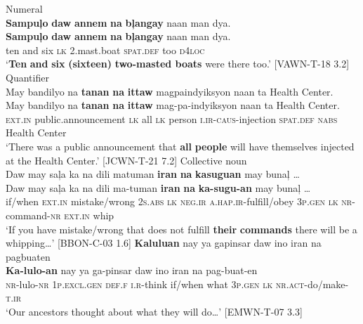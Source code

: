 \newpage
\ea
Numeral \\
\textbf{Sampuļo}  \textbf{daw}  \textbf{annem}  \textbf{na}  \textbf{bļangay}  naan  man  dya. \\\smallskip
 \gll \textbf{Sampuļo}  \textbf{daw}  \textbf{annem}  \textbf{na}  \textbf{bļangay}  naan  man  dya. \\
ten  and  six  \textsc{lk}  2.mast.boat  \textsc{spat.def} too  \textsc{d}4\textsc{loc} \\
\glt ‘\textbf{Ten} \textbf{and} \textbf{six} \textbf{(sixteen)} \textbf{two-masted boats} were there too.’ [VAWN-T-18 3.2]
\z
\ea
Quantifier \\
May  bandilyo  na  \textbf{tanan}  \textbf{na}  \textbf{ittaw}  magpaindyiksyon naan  ta  Health Center. \\\smallskip
 \gll May  bandilyo  na  \textbf{tanan}  \textbf{na}  \textbf{ittaw}  mag-pa-indyiksyon naan  ta  Health Center. \\
\textsc{ext.in} public.announcement  \textsc{lk}  all  \textsc{lk}  person  \textsc{i.ir}-\textsc{caus}-injection
\textsc{spat.def}  \textsc{nabs} Health Center \\
\glt `There was a public announcement that \textbf{all} \textbf{people} will have themselves injected at the Health Center.’ [JCWN-T-21 7.2]
\z
\ea
Collective noun \\
Daw  may  saļa  ka  na  dili  matuman \textbf{iran}  \textbf{na}  \textbf{kasuguan}  may   bunaļ … \\\smallskip
 \gll Daw  may  saļa  ka  na  dili  ma-tuman \textbf{iran}  \textbf{na}  \textbf{ka-sugu-an}  may   bunaļ … \\
if/when  \textsc{ext.in}  mistake/wrong  2\textsc{s.abs}  \textsc{lk}  \textsc{neg.ir}  \textsc{a.hap.ir}-fulfill/obey
3\textsc{p.gen}  \textsc{lk}  \textsc{nr}-command-\textsc{nr}  \textsc{ext.in}  whip \\
\glt `If you have mistake/wrong that does not fulfill \textbf{their} \textbf{commands} there will be a whipping…’ [BBON-C-03 1.6]
\z
\ea
\textbf{Kaluluan}  nay  ya  gapinsar  daw  ino  iran  na pagbuaten \\\smallskip
 \gll \textbf{Ka-lulo-an}  nay  ya  ga-pinsar  daw  ino  iran  na pag-buat-en \\
\textsc{nr}-lulo-\textsc{nr} 1\textsc{p.excl.gen}  \textsc{def.f}  \textsc{i.r}-think  if/when  what 3\textsc{p.gen}  \textsc{lk} \textsc{nr.act}-do/make-\textsc{t.ir} \\
\glt `Our ancestors thought about what they will do…’ [EMWN-T-07 3.3]
\z


